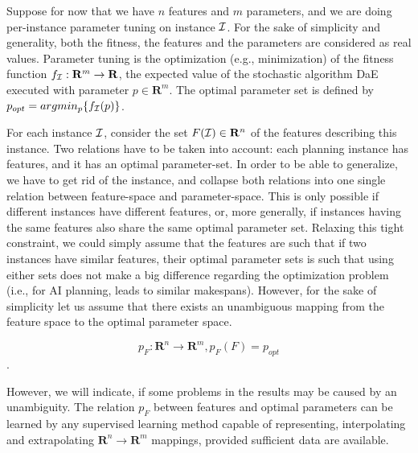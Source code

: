 \documentclass[runningheads,a4paper]{llncs}
\begin{document}
Suppose for now that we have $n$ features and $m$ parameters, and we are doing per-instance parameter tuning on instance $\cal I$. For the sake of simplicity and generality, both the fitness, the features and the parameters are considered as real values. Parameter tuning is the optimization (e.g., minimization) of the fitness function \begin{math}f_{\cal I}:\mathbf{R}^m\to \mathbf{R} \end{math}, the expected value of the stochastic algorithm DaE executed with parameter \begin{math} p \in \mathbf{R}^m \end{math}. The optimal parameter set is defined by \begin{math} p_{opt}=argmin_p\{f_{\cal I}(p)\} \end{math}. 

For each instance $\cal I$, consider the set \begin{math} F({\cal I}) \in \mathbf{R}^n \end{math} of the features describing this instance. 
Two relations have to be taken into account: each planning instance has features, and it has an optimal parameter-set. In order to be able to generalize, we have to get rid of the instance, and collapse both relations into one single relation between feature-space and parameter-space. This is only possible if different instances have different features, or, more generally, if instances having the same features also share the same optimal parameter set. Relaxing this tight constraint, we could simply assume that the features are such that if two instances have similar features, their optimal parameter sets is such that using either sets does not make a big difference regarding the optimization problem (i.e., for AI planning, leads to similar makespans). However, for the sake of simplicity let us assume that there exists an unambiguous mapping from the feature space to the optimal parameter space. 

\begin{equation} p_F: \mathbf{R}^n \to \mathbf{R}^m, p_F(F)=p_{opt} \end{equation}.	

However, we will indicate, if some problems in the results may be caused by an unambiguity. The relation \begin{math} p_F \end{math} between features and optimal parameters can be learned by any supervised learning method capable of representing, interpolating and extrapolating  \begin{math}\mathbf{R}^n\to \mathbf{R}^m \end{math} mappings, provided sufficient data are available.
\end{document}
